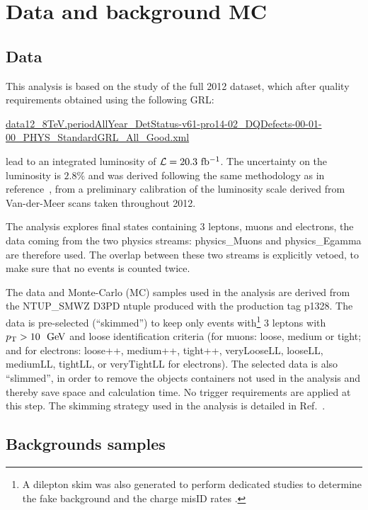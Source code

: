 \section{Data and background MC}
\subsection{Data}
\label{sec:subsection_data}

This analysis is based on the study of the full 2012 dataset, which after quality
requirements obtained using the following GRL:

  \begin{footnotesize}
 \url{data12_8TeV.periodAllYear_DetStatus-v61-pro14-02_DQDefects-00-01-00_PHYS_StandardGRL_All_Good.xml}
  \end{footnotesize}

lead to an integrated luminosity of $\mathcal{L}=20.3~\mbox{fb$^{-1}$}$. The uncertainty on the luminosity is $2.8\%$ and was derived following the same methodology as in reference~\cite{Aad:2013ucp}, from a preliminary calibration of the luminosity scale derived from Van-der-Meer scans taken throughout 2012.

The analysis explores final states containing 3 leptons, muons and electrons, the data coming from the two physics streams: physics\_Muons and physics\_Egamma are therefore used.  The overlap between these two streams is explicitly vetoed, to make sure that no events is counted twice.

The data and Monte-Carlo (MC) samples used in the analysis are derived from the NTUP\_SMWZ D3PD ntuple produced with the production tag p1328. 
The data is pre-selected (``skimmed'') to keep only events with\footnote{A dilepton skim was also generated to perform dedicated studies to determine the fake background  and the charge misID rates .} 3 leptons with $\pt>10~\GeV$ and loose identification criteria (for muons: loose, medium or tight; and for electrons: loose++, medium++, tight++, veryLooseLL, looseLL, mediumLL, tightLL, or veryTightLL for electrons). The selected data is also ``slimmed'', in order to remove the objects containers not used in the analysis and thereby save space and calculation time. No trigger requirements are applied at this step. The skimming strategy used in the analysis is detailed in Ref.~\cite{WWWTwiki:Skim}.



\subsection{Backgrounds samples}
\label{sec:subsection_datasets_MC}

